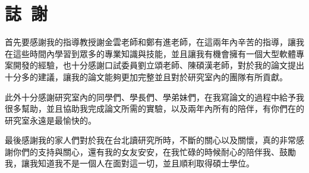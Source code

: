 \chapter*{誌~謝~}

\indent %
 首先要感謝我的指導教授謝金雲老師和鄭有進老師，在這兩年內辛苦的指導，讓我在這些時間內學習到眾多的專業知識與技能，並且讓我有機會擁有一個大型軟體專案開發的經驗，也十分感謝口試委員劉立頌老師、陳碩漢老師，對於我的論文提出十分多的建議，讓我的論文能夠更加完整並且對於研究室內的團隊有所貢獻。

\indent %
 此外十分感謝研究室內的同學們、學長們、學弟妹們，在我寫論文的過程中給予我很多幫助，並且協助我完成論文所需的實驗，以及兩年內所有的陪伴，有你們在的研究室永遠是最愉快的。

\indent %
 最後感謝我的家人們對於我在台北讀研究所時，不斷的關心以及關懷，真的非常感謝你們的支持與關心，還有我的女友安安，在我忙碌的時候耐心的陪伴我、鼓勵我，讓我知道我不是一個人在面對這一切，並且順利取得碩士學位。